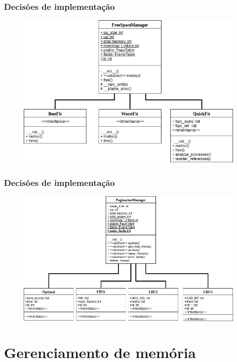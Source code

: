 \documentclass{beamer}
\begin{document}
\begin{frame}
\frametitle{Decisões de implementação}
\begin{figure}
\includegraphics[scale=0.4]{class_fspc.png}
\end{figure}
\end{frame}

\begin{frame}
\frametitle{Decisões de implementação}
\begin{figure}
\includegraphics[scale=0.35]{class_paginators.png}
\end{figure}
\end{frame}

\section{Gerenciamento de memória}
\end{document}
